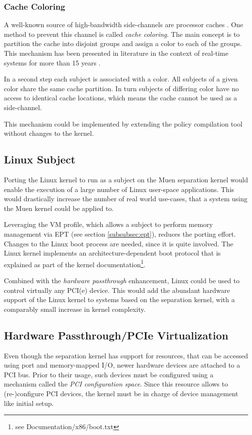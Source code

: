 \subsubsection{Cache Coloring}
A well-known source of high-bandwidth side-channels are processor caches
\cite{cryptoeprint:2005:271}. One method to prevent this channel is called
\emph{cache coloring}. The main concept is to partition the cache into disjoint
groups and assign a color to each of the groups. This mechanism has been
presented in literature in the context of real-time systems for more than 15
years \cite{Mueller:1995:CSS:216633.216677}
\cite{Liedtke:1997:OCP:523983.828369}.

In a second step each subject is associated with a color. All subjects of a
given color share the same cache partition. In turn subjects of differing color
have no access to identical cache locations, which means the cache cannot be
used as a side-channel.

This mechanism could be implemented by extending the policy compilation tool
without changes to the kernel.

\subsection{Linux Subject}
Porting the Linux kernel to run as a subject on the Muen separation kernel would
enable the execution of a large number of Linux user-space applications. This
would drastically increase the number of real world use-cases, that a system
using the Muen kernel could be applied to.

Leveraging the VM profile, which allows a subject to perform memory management
via EPT (see section \ref{subsubsec:ept}), reduces the porting effort. Changes
to the Linux boot process are needed, since it is quite involved. The Linux
kernel implements an architecture-dependent boot protocol that is explained as
part of the kernel documentation\footnote{see Documentation/x86/boot.txt}.

Combined with the \emph{hardware passthrough} enhancement, Linux could be used
to control virtually any PCI(e) device. This would add the abundant hardware
support of the Linux kernel to systems based on the separation kernel, with a
comparably small increase in kernel complexity.

\subsection{Hardware Passthrough/PCIe Virtualization}
Even though the separation kernel has support for resources, that can be
accessed using port and memory-mapped I/O, newer hardware devices are attached
to a PCI bus. Prior to their usage, such devices must be configured using a
mechanism called the \emph{PCI configuration space}. Since this resource allows
to (re-)configure PCI devices, the kernel must be in charge of device
management like initial setup.

